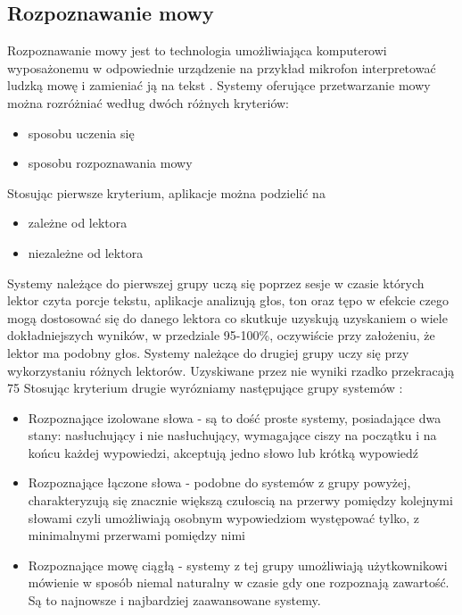 \subsection{Rozpoznawanie mowy}
Rozpoznawanie mowy jest to technologia umożliwiająca komputerowi wyposażonemu w odpowiednie urządzenie na przykład mikrofon interpretować ludzką mowę i zamieniać ją na tekst \cite{douglas2002}. Systemy oferujące przetwarzanie mowy można rozróżniać	 według dwóch różnych kryteriów:
\begin{itemize}
	\item sposobu uczenia się
	\item sposobu rozpoznawania mowy
\end{itemize}
Stosując pierwsze kryterium, aplikacje można podzielić na
\begin{itemize}
	\item zależne od lektora
	\item niezależne od lektora
\end{itemize}
Systemy należące do pierwszej grupy uczą się poprzez sesje w czasie których lektor czyta porcje tekstu, aplikacje analizują głos, ton oraz tępo  w efekcie czego mogą dostosować się do danego lektora co skutkuje uzyskują uzyskaniem o wiele dokładniejszych wyników, w przedziale 95-100\%, oczywiście przy założeniu, że lektor ma podobny głos.  Systemy należące do drugiej grupy uczy się przy wykorzystaniu różnych lektorów. Uzyskiwane przez nie wyniki rzadko przekracają 75%
Stosując kryterium drugie wyrózniamy następujące grupy systemów \cite{gaikwad2010} :
\begin{itemize}
	\item Rozpoznające izolowane słowa - są to dość proste systemy, posiadające dwa stany: nasłuchujący i nie nasłuchujący,  wymagające ciszy na początku i na końcu każdej wypowiedzi,  akceptują jedno słowo lub krótką wypowiedź 
	\item Rozpoznające łączone słowa - podobne do systemów z grupy powyżej, charakteryzują się znacznie większą czułoscią na przerwy pomiędzy kolejnymi słowami czyli umożliwiają osobnym wypowiedziom występować tylko, z minimalnymi przerwami pomiędzy nimi
	\item Rozpoznające mowę ciągłą -  systemy z tej grupy umożliwiają użytkownikowi mówienie w sposób niemal naturalny w czasie gdy one rozpoznają zawartość. Są to najnowsze i najbardziej zaawansowane systemy.
\end{itemize}
